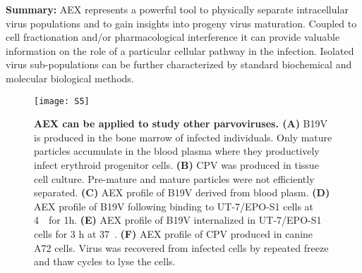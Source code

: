 \medskip
\textbf{Summary:} AEX represents a powerful tool to physically separate intracellular virus populations and to gain insights into progeny virus maturation. Coupled to cell fractionation and/or pharmacological interference it can provide valuable information on the role of a particular cellular pathway in the infection. Isolated virus sub-populations can be further characterized by standard biochemical and molecular biological methods.          
 






\begin{figure}
\centering
  \texttt{[image: S5]} \\[-0.2cm]
  \caption[Anion-Exchange Chromatography Performed with Other Parvoviruses]
   {\textbf{AEX can be applied to study other parvoviruses. (A)} B19V is produced in the bone marrow of infected individuals. Only mature particles accumulate in the blood plasma where they productively infect erythroid progenitor cells. \textbf{(B)} CPV was produced in tissue cell culture. Pre-mature and mature particles were not efficiently separated. \textbf{(C)} AEX profile of B19V derived from blood plasm. \textbf{(D)} AEX profile of B19V following binding to UT-7/EPO-S1 cells at \mbox{4 \textcelsius}~for 1h. \textbf{(E)} AEX profile of B19V internalized in UT-7/EPO-S1 cells for 3 h at \mbox{37 \textcelsius}.  \textbf{(F)} AEX profile of CPV produced in canine A72 cells. Virus was recovered from infected cells by repeated freeze and thaw cycles to lyse the cells.} 
\label{S5}
\end{figure}





    




\renewcommand\thefigure{\thechapter.\arabic{figure}} 

